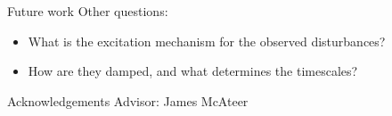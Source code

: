 \documentclass[table]{beamer}
\begin{document}
\begin{frame}{Future work}
    Other questions:
    \begin{itemize}
        \item What is the excitation mechanism for the observed
            disturbances?
        \item How are they damped, and what determines the timescales?
    \end{itemize}
\end{frame}%
\begin{frame}{Acknowledgements}
    Advisor: James McAteer
\end{frame}%
\end{document}
